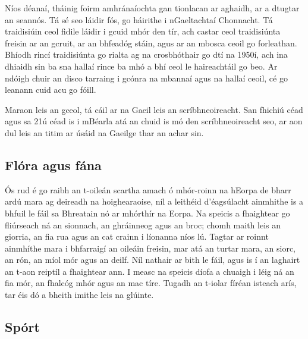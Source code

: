 \documentclass[a4paper,12pt]{article}
\theoremstyle{plain} %
\theoremstyle{definition} %
\theoremstyle{remark} %
\begin{document}
Níos déanaí, tháinig foirm amhránaíochta gan tionlacan ar aghaidh, ar a dtugtar an seannós. Tá sé seo láidir fós, go háirithe i nGaeltachtaí Chonnacht. Tá traidisiúin ceol fidile láidir i gcuid mhór den tír, ach castar ceol traidisiúnta freisin ar an gcruit, ar an bhfeadóg stáin, agus ar an mbosca ceoil go forleathan. Bhíodh rincí traidisiúnta go rialta ag na crosbhóthair go dtí na 1950í, ach ina dhiaidh sin ba sna hallaí rince ba mhó a bhí ceol le haireachtáil go beo. Ar ndóigh chuir an disco tarraing i gcónra na mbannaí agus na hallaí ceoil, cé go leanann cuid acu go fóill.

Maraon leis an gceol, tá cáil ar na Gaeil leis an scríbhneoireacht. San fhichiú céad agus sa 21ú céad is i mBéarla atá an chuid is mó den scríbhneoireacht seo, ar aon dul leis an titim ar úsáid na Gaeilge thar an achar sin.

\subsection{Flóra agus fána}

Ós rud é go raibh an t-oileán scartha amach ó mhór-roinn na hEorpa de bharr ardú mara ag deireadh na hoighearaoise, níl a leithéid d'éagsúlacht ainmhithe is a bhfuil le fáil sa Bhreatain nó ar mhórthír na Eorpa. Na speicis a fhaightear go fliúrseach ná an sionnach, an ghráinneog agus an broc; chomh maith leis an giorria, an fia rua agus an cat crainn i líonanna níos lú. Tagtar ar roinnt ainmhíthe mara i bhfarraigí an oileáin freisin, mar atá an turtar mara, an siorc, an rón, an míol mór agus an deilf.
Níl nathair ar bith le fáil, agus is í an laghairt an t-aon reiptíl a fhaightear ann.
I measc na speicis díofa a chuaigh i léig ná an fia mór, an fhalcóg mhór agus an mac tíre. Tugadh an t-iolar fíréan isteach arís, tar éis dó a bheith imithe leis na glúinte.

\subsection{Spórt}
\end{document}
